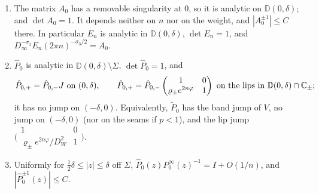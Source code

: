 \begin{lemma}\label{lem:comparison-parametrix}
\begin{enumerate}
\item[(i)] The matrix $A_0$ has a removable singularity at $0$, so it is analytic on $\mathbb D(0,\delta)$; and $\det A_0=1$.
  It depends neither on $n$ nor on the
  weight, and $|A_0^{\pm1}|\le C$ there. In particular $E_n$ is analytic in $\mathbb D(0,\delta)$, $\det E_n=1$, and
  $D_\infty^{-\sigma_3}E_n(2\pi n)^{-\sigma_3/2}=A_0$.
\item[(ii)] $\hat P_0$ is analytic in $\mathbb D(0,\delta)\setminus\Sigma$, $\det\hat P_0=1$, and
  \[
    \hat P_{0,+}=\hat P_{0,-}J\ \text{on }(0,\delta),\qquad
    \hat P_{0,+}=\hat P_{0,-}\begin{pmatrix}1&0\\\varrho_\pm e^{2n\varphi}&1\end{pmatrix}\ \text{on the lips in }\mathbb D(0,\delta)\cap\mathbb{C}_\pm;
  \]
  it has no jump on $(-\delta,0)$. Equivalently, $\tilde P_0$ has the band jump of $V$, no jump on $(-\delta,0)$ (nor on
  the seams if $p<1$), and the lip jump $\bigl(\begin{smallmatrix}1&0\\\varrho_\pm e^{2n\varphi}/D_W^2&1\end{smallmatrix}\bigr)$.
\item[(iii)] Uniformly for $\frac12\delta\le|z|\le\delta$ off $\Sigma$, $\hat P_0(z)P^\infty_0(z)^{-1}=I+O(1/n)$, and
  $|\hat P_0^{\pm1}(z)|\le C$.
\end{enumerate}
\end{lemma}

